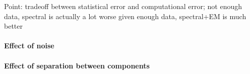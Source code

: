 
Point: tradeoff between statistical error and computational error;
not enough data, spectral is actually a lot worse
given enough data, spectral+EM is much better

\paragraph{Effect of noise}

\paragraph{Effect of separation between components}

